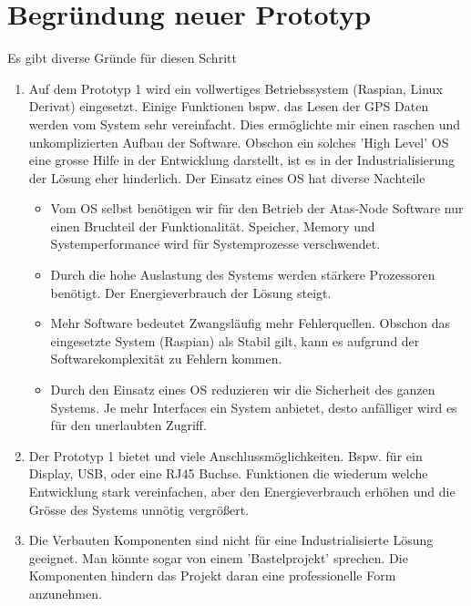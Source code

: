 \documentclass[11pt,english,german]{report}
\theoremstyle{definition}
\begin{document}
\section{Begründung neuer Prototyp}
Es gibt diverse Gründe für diesen Schritt
\begin{enumerate}
	\item Auf dem Prototyp 1 wird ein vollwertiges Betriebssystem (Raspian, Linux Derivat) eingesetzt. Einige Funktionen bspw. das Lesen der GPS Daten werden vom System sehr vereinfacht. Dies ermöglichte mir einen raschen und unkomplizierten Aufbau der Software. Obschon ein solches 'High Level' OS eine grosse Hilfe in der Entwicklung darstellt, ist es in der Industrialisierung der Lösung eher hinderlich. Der Einsatz eines OS hat diverse Nachteile
	\begin{itemize}
		\item Vom OS selbst benötigen wir für den Betrieb der Atas-Node Software nur einen Bruchteil der Funktionalität. Speicher, Memory und Systemperformance wird für Systemprozesse verschwendet. 
		\item Durch die hohe Auslastung des Systems werden stärkere Prozessoren benötigt. Der Energieverbrauch der Lösung steigt.
		\item Mehr Software bedeutet Zwangsläufig mehr Fehlerquellen. Obschon das eingesetzte System (Raspian) als Stabil gilt, kann es aufgrund der Softwarekomplexität zu Fehlern kommen.
		\item Durch den Einsatz eines OS reduzieren wir die Sicherheit des ganzen Systems. Je mehr Interfaces ein System anbietet, desto anfälliger wird es für den unerlaubten Zugriff.
	\end{itemize}
	\item Der Prototyp 1 bietet und viele Anschlussmöglichkeiten. Bspw. für ein Display, USB, oder eine RJ45 Buchse. Funktionen die wiederum welche Entwicklung stark vereinfachen, aber den Energieverbrauch erhöhen und die Grösse des Systems unnötig vergrößert. 
	\item Die Verbauten Komponenten sind nicht für eine Industrialisierte Lösung geeignet. Man könnte sogar von einem 'Bastelprojekt' sprechen. Die Komponenten hindern das Projekt daran eine professionelle Form anzunehmen.
\end{enumerate}
\end{document}
